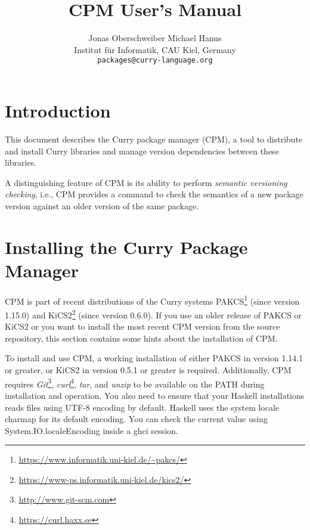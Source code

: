 \documentclass[11pt]{article}
\renewcommand{\tt}{\usefont{OT1}{cmtt}{m}{n}\selectfont}
\newcommand{\codefont}{\small\tt}
\newcommand{\code}[1]{\mbox{\codefont #1}}
\begin{document}
\title{CPM User's Manual}

\author{Jonas Oberschweiber \qquad Michael Hanus\\[1ex]
{\small Institut f\"ur Informatik, CAU Kiel, Germany}\\[1ex]
{\small\texttt{packages@curry-language.org}}
}

\maketitle

\tableofcontents

\clearpage


\section{Introduction}

This document describes the Curry package manager (CPM), a tool to
distribute and install Curry libraries and manage version dependencies
between these libraries.

A distinguishing feature of CPM is its ability to perform
\emph{semantic versioning checking}, i.e., CPM provides a command
to check the semantics of a new package version against an
older version of the same package.


\bigskip\bigskip

\section{Installing the Curry Package Manager}

CPM is part of recent distributions of the Curry systems
PAKCS\footnote{\url{https://www.informatik.uni-kiel.de/~pakcs/}}
(since version 1.15.0)
and
KiCS2\footnote{\url{https://www-ps.informatik.uni-kiel.de/kics2/}}
(since version 0.6.0).
If you use an older release of PAKCS or KiCS2 or you want to
install the most recent CPM version from the source repository,
this section contains some hints about the installation of CPM.

To install and use CPM, a working installation of either
PAKCS in version 1.14.1 or greater, or
KiCS2 in version 0.5.1 or greater is required. Additionally, CPM requires 
\emph{Git}\footnote{\url{http://www.git-scm.com}},
\emph{curl}\footnote{\url{https://curl.haxx.se}},
\emph{tar},
and \emph{unzip} to be available on the \code{PATH} during installation and 
operation. You also need to ensure that your Haskell installations reads files
using UTF-8 encoding by default. Haskell uses the system locale charmap for its
default encoding. You can check the current value using 
\code{System.IO.localeEncoding} inside a \code{ghci} session.
\end{document}
